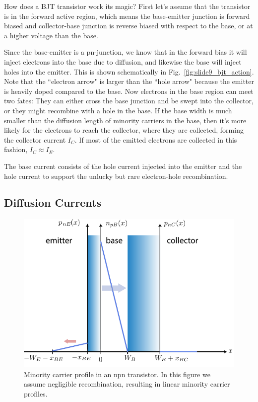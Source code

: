 How does a BJT transistor work its magic?   First let's assume that the transistor is in the forward active region, which means the base-emitter junction is forward biased and collector-base junction is reverse biased with respect to the base, or at a higher voltage than the base.  

Since the base-emitter is a pn-junction, we know that in the forward bias it will inject electrons into the base due to diffusion, and likewise the base will inject holes into the emitter.  This is shown schematically in Fig.~\ref{fig:slide9_bjt_action}.  Note that the ``electron arrow" is larger than the ``hole arrow" because the emitter is heavily doped compared to the base.  Now electrons in the base region can meet two fates:  They can either cross the base junction and be swept into the collector, or they might recombine with a hole in the base.  If the base width is much smaller than the diffusion length of minority carriers in the base, then it's more likely for the electrons to reach the collector, where they are collected, forming the collector current $I_C$.  If most of the emitted electrons are collected in this fashion, $I_C \approx I_E$.  

The base current consists of the hole current injected into the emitter and the hole current to support the unlucky but rare electron-hole recombination.  



\subsection{Diffusion Currents}

\begin{figure}[tb]
\begin{center}
\includegraphics[width=.75\columnwidth]{slide10_minority_carriers}
\end{center}
\caption{Minority carrier profile in an npn transistor.  In this figure we assume negligible recombination, resulting in linear minority carrier profiles.} \label{fig:slide10_minority_carriers}
\end{figure}

